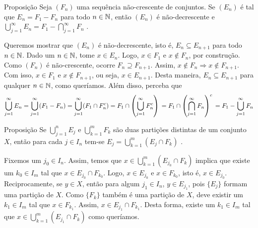 \begin{env}{Proposição}
\label{prop:sequencia-decrescente-conjuntos-resultado-A_n}
Seja $(F_n)$ uma sequência não-crescente de conjuntos. 
Se $(E_n)$ é tal que $E_n = F_1 - F_n$ para todo $n \in \operatorname{\mathbb{N}}$, então $(E_n)$ é não-decrescente e 
$\displaystyle \bigcup_{j = 1}^\infty E_n = \displaystyle F_1 - \bigcap_{j = 1}^\infty F_n$
\cite{bartle}.
\end{env}

\begin{prova}
    Queremos mostrar que $(E_n)$ é não-decrescente, isto é, $E_n \subseteq E_{n+1}$ para todo $n \in \operatorname{\mathbb{N}}$.
    Dado um $n \in \operatorname{\mathbb{N}}$, tome $x \in E_n$. 
    Logo, $x \in F_1$ e $x \notin F_n$, por construção.
    Como $(F_n)$ é não-crescente, ocorre $F_{n} \supseteq F_{n+1}$. 
    Assim, $x \notin F_n \Rightarrow x \notin F_{n+1}$.
    Com isso, $x \in F_1$ e $x \notin F_{n+1}$, ou seja,
    $x \in E_{n+1}$.
    Desta maneira, $E_n \subseteq E_{n+1}$ para qualquer $n \in \operatorname{\mathbb{N}}$, como queríamos.
    Além disso, perceba que
$$
    	\bigcup_{j = 1}^\infty E_n 
    	= 
    	\bigcup_{j = 1}^\infty (F_1-F_n)\\
    	= 
    	\bigcup_{j = 1}^\infty (F_1 \cap F_n^c)\\
    	= 
    	F_1 \cap \left(\bigcup_{j = 1}^\infty F_n^c\right)\\
    	= 
    	F_1 \cap \left(\bigcap_{j = 1}^\infty F_n\right)^c\\
    	= 
    	F_1 -\bigcup_{j = 1}^\infty F_n
$$
\end{prova}

\begin{env}{Proposição}
	\label{prop: duas partições}
	Se $\displaystyle \bigcup_{j = 1}^n E_j$ e $\displaystyle \bigcup_{k = 1}^m F_k$ são duas partições distintas de um conjunto $X$, então
	para cada $j \in I_n$ tem-se $E_j = \displaystyle \bigcup_{k = 1}^m (E_j \cap F_k)$
	\cite{bartle}.
\end{env}
\begin{prova}
	Fixemos um $j_0 \in I_n$.
	Assim, temos que $\displaystyle x \in \bigcup_{k = 1}^m (E_{j_0} \cap F_k)$ implica que existe um $k_0 \in I_m$ tal que  $x \in E_{j_0}\cap F_{k_0}$.
	Logo, $x \in E_{j_0}$ e $x \in F_{k_0}$, isto é, $x \in E_{j_0}$.
	Reciprocamente, se $y \in X$, então para algum $j_1 \in I_n$, $y \in E_{j_1}$, pois $\{E_j\}$ formam uma partição de $X$.
	Como $\{F_k\}$ também é uma partição de $X$, deve existir um $k_1 \in I_m$ tal que $x \in F_{k_1}$.
	Assim, $x \in E_{j_1} \cap F_{k_1}$. 
	Desta forma, existe um $k_1 \in I_m$ tal que $x \in \displaystyle \bigcup_{k = 1}^m (E_{j_1} \cap F_{k})$ como queríamos.	 
\end{prova}

